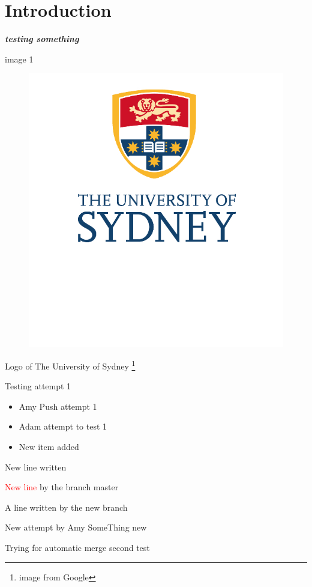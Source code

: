 \documentclass[10pt]{article}
\newcommand{\boldit}[1]{\textbf{\textit{#1}}}
\begin{document}
\section{\textsf{Introduction}}
\boldit{testing something}

image 1 
\begin{figure}[hbt!]
  \centering
  \includegraphics{usyd}
\end{figure}

Logo of The University of Sydney \footnote{image from Google}

Testing attempt 1
\begin{itemize}
  \item Amy Push attempt 1
  \item Adam attempt to test 1
  \item New item added
\end{itemize}
New line written

\textcolor{red}{New line} by the branch master


A line written by the new branch

New attempt by Amy
SomeThing new

Trying for automatic merge
second test
\end{document}
